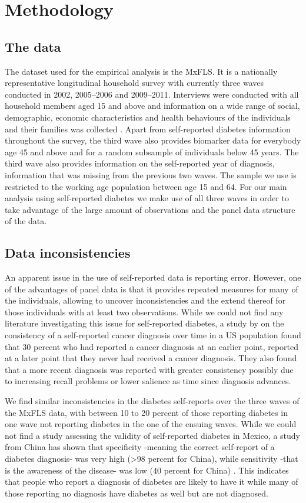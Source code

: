 

\section{Methodology}
\subsection{The data}
The dataset used for the empirical analysis is the \acf{MxFLS}.
It is a nationally representative longitudinal household survey with
currently three waves conducted in 2002, 2005--2006 and 2009--2011.
Interviews were conducted with all household members aged 15 and above
and information on a wide range of social, demographic, economic characteristics
and health behaviours of the individuals and their families was collected
\citep{Rubalcava2013}. Apart from self-reported diabetes information
throughout the survey, the third wave also provides biomarker data
for everybody age 45 and above and for a random subsample of individuals
below 45 years. The third wave also provides information on the self-reported
year of diagnosis, information that was missing from the previous
two waves. The sample we use is restricted to the working age population
between age 15 and 64. For our main analysis using self-reported diabetes
we make use of all three waves in order to take advantage of the large
amount of observations and the panel data structure of the data.
\subsection{Data inconsistencies}

An apparent issue in the use of self-reported data is reporting error.
However, one of the advantages of panel data is that it provides repeated
measures for many of the individuals, allowing to uncover inconsistencies
and the extend thereof for those individuals with at least two observations.
While we could not find any literature investigating this issue for
self-reported diabetes, a study by \citet{Zajacova2010} on the consistency
of a self-reported cancer diagnosis over time in a US population found
that 30 percent who had reported a cancer diagnosis at an earlier
point, reported at a later point that they never had received a cancer
diagnosis. They also found that a more recent diagnosis was reported
with greater consistency possibly due to increasing recall problems
or lower salience as time since diagnosis advances. 

We find similar inconsistencies in the diabetes self-reports over
the three waves of the \ac{MxFLS} data, with between 10 to 20 percent
of those reporting diabetes in one wave not reporting diabetes in
the one of the ensuing waves. While we could not find a study assessing
the validity of self-reported diabetes in Mexico, a study from China
has shown that specificity -meaning the correct self-report of a diabetes
diagnosis- was very high (>98 percent for China), while sensitivity
-that is the awareness of the disease- was low (40 percent for China)
\citep{Yuan2015a}. This indicates that people who report a diagnosis
of diabetes are likely to have it while many of those reporting no
diagnosis have diabetes as well but are not diagnosed. 

